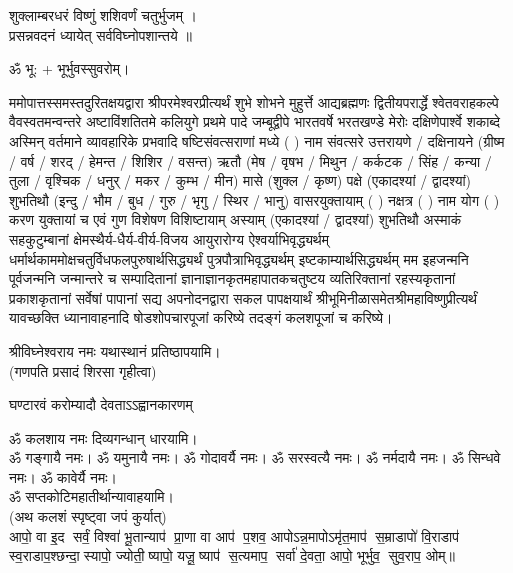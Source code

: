 शुक्लाम्बरधरं विष्णुं शशिवर्णं चतुर्भुजम् ।\\
प्रसन्नवदनं ध्यायेत् सर्वविघ्नोपशान्तये ॥

ॐ भू: + भूर्भुवस्सुवरोम्।


ममोपात्तस्समस्तदुरितक्षयद्वारा श्रीपरमेश्वरप्रीत्यर्थं शुभे शोभने मुहुर्त्ते आद्यब्रह्मणः
द्वितीयपरार्द्धे श्वेतवराहकल्पे वैवस्वतमन्वन्तरे अष्टाविंशतितमे कलियुगे प्रथमे पादे
जम्बूद्वीपे भारतवर्षे भरतखण्डे मेरोः दक्षिणेपार्श्वे शकाब्दे अस्मिन् वर्तमाने व्यावहारिके
 प्रभवादि षष्टिसंवत्सराणां मध्ये (	) नाम संवत्सरे उत्तरायणे / दक्षिनायने 
(ग्रीष्म / वर्ष / शरद् / हेमन्त / शिशिर / वसन्त) ऋतौ  (मेष / वृषभ / मिथुन / कर्कटक / सिंह / कन्या / तुला / 
वृश्चिक / धनुर् / मकर / कुम्भ / मीन) मासे (शुक्ल / कृष्ण) पक्षे (एकादश्यां / द्वादश्यां) शुभतिथौ
(इन्दु / भौम / बुध / गुरु / भृगु / स्थिर / भानु) वासरयुक्तायाम्
(  ) नक्षत्र (  ) नाम  योग  (  ) करण युक्तायां च एवं गुण विशेषण विशिष्टायाम्
अस्याम् (एकादश्यां / द्वादश्यां) शुभतिथौ 
अस्माकं सहकुटुम्बानां क्षेमस्थैर्य-धैर्य-वीर्य-विजय आयुरारोग्य ऐश्वर्याभिवृद्ध्यर्थम्
 धर्मार्थकाममोक्ष\-चतुर्विधफलपुरुषार्थसिद्ध्यर्थं पुत्रपौत्राभि\-वृद्ध्यर्थम् इष्टकाम्यार्थसिद्ध्यर्थम्
मम इहजन्मनि पूर्वजन्मनि जन्मान्तरे च सम्पादितानां ज्ञानाज्ञानकृतमहा\-पातकचतुष्टय
व्यतिरिक्तानां रहस्यकृतानां प्रकाशकृतानां सर्वेषां पापानां सद्य अपनोदनद्वारा सकल 
पापक्षयार्थं श्रीभूमिनीळासमेतश्रीमहाविष्णुप्रीत्यर्थं यावच्छक्ति ध्यानावाहनादि 
षोडशोपचारपूजां करिष्ये तदङ्गं कलशपूजां च करिष्ये।


श्रीविघ्नेश्वराय नमः यथास्थानं प्रतिष्ठापयामि।\\
(गणपति प्रसादं शिरसा गृहीत्वा)


{घण्टारवं करोम्यादौ देवताऽऽह्वानकारणम्}

ॐ कलशाय नमः दिव्यगन्धान् धारयामि।\\
ॐ गङ्गायै नमः। ॐ यमुनायै नमः। ॐ गोदावर्यै नमः।  ॐ सरस्वत्यै नमः। ॐ नर्मदायै नमः। ॐ सिन्धवे नमः। ॐ कावेर्यै नमः।\\
 ॐ सप्तकोटिमहातीर्थान्यावाहयामि। \\

(अथ कलशं स्पृष्ट्वा जपं कुर्यात्) \\
आपो॒ वा इ॒द सर्वं॒ विश्वा॑ भू॒तान्याप॑ प्रा॒णा वा आप॑ प॒शव॒ आपो\-ऽन्न॒मापोऽमृ॑त॒माप॑ स॒म्राडापो॑ वि॒राडाप॑ स्व॒राडाप॒श्\-छन्दा॒स्यापो॒ ज्योती॒ष्यापो॒ यजू॒ष्याप॑ स॒त्यमाप॒ सर्वा॑ दे॒वता॒ आपो॒ भूर्भुव॒ सुव॒राप॒ ओम्॥\\

